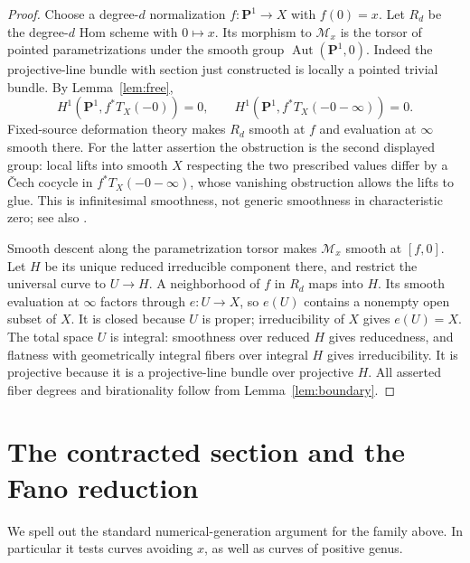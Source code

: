 \documentclass[11pt]{article}
\newcommand{\PP}{\mathbf P}
\newcommand{\Aut}{\operatorname{Aut}}
\begin{document}
\begin{proof}
Choose a degree-$d$ normalization $f:\PP^1\to X$ with $f(0)=x$.
Let $R_d$ be the degree-$d$ Hom scheme with $0\mapsto x$.
Its morphism to $\mathcal M_x$ is the torsor of pointed parametrizations
under the smooth group $\Aut(\PP^1,0)$. Indeed the projective-line bundle
with section just constructed is locally a pointed trivial bundle.
By Lemma~\ref{lem:free},
\[
H^1(\PP^1,f^*T_X(-0))=0,\qquad
H^1(\PP^1,f^*T_X(-0-\infty))=0.
\]
Fixed-source deformation theory makes $R_d$ smooth at $f$ and evaluation
at $\infty$ smooth there. For the latter assertion the obstruction is
the second displayed group: local lifts into smooth $X$ respecting the
two prescribed values differ by a \v Cech cocycle in
$f^*T_X(-0-\infty)$, whose vanishing obstruction allows the lifts to
glue. This is infinitesimal smoothness, not generic smoothness in
characteristic zero; see also \cite[Proposition 4.7]{Gounelas}.

Smooth descent along the parametrization torsor makes $\mathcal M_x$
smooth at $[f,0]$. Let $H$ be its unique reduced irreducible component
there, and restrict the universal curve to $U\to H$. A neighborhood
of $f$ in $R_d$ maps into $H$. Its smooth evaluation at $\infty$ factors
through $e:U\to X$, so $e(U)$ contains a nonempty open subset of $X$.
It is closed because $U$ is proper; irreducibility of $X$ gives $e(U)=X$.
The total space $U$ is integral: smoothness over reduced $H$ gives
reducedness, and flatness with geometrically integral fibers over integral
$H$ gives irreducibility. It is projective because it is a projective-line
bundle over projective $H$. All asserted fiber degrees and birationality
follow from Lemma~\ref{lem:boundary}.
\end{proof}

\section{The contracted section and the Fano reduction}

We spell out the standard numerical-generation argument for the family
above. In particular it tests curves avoiding $x$, as well as curves of
positive genus.
\end{document}
